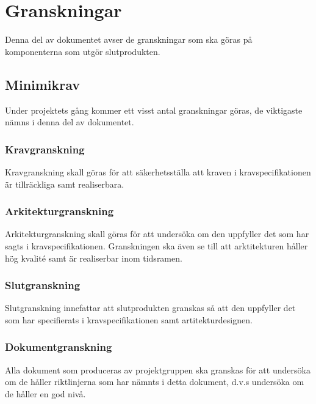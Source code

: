 \section{Granskningar}
Denna del av dokumentet avser de granskningar som ska göras på komponenterna som utgör slutprodukten. 

\subsection{Minimikrav}
Under projektets gång kommer ett visst antal granskningar göras, de viktigaste nämns i denna del av dokumentet. 

\subsubsection{Kravgranskning}
Kravgranskning skall göras för att säkerhetsställa att kraven i kravspecifikationen är tillräckliga samt realiserbara.

\subsubsection{Arkitekturgranskning}
Arkitekturgranskning skall göras för att undersöka om den uppfyller det som har sagts i kravspecifikationen. Granskningen ska även se till att arktitekturen håller hög kvalité samt är realiserbar inom tidsramen.

\subsubsection{Slutgranskning}
Slutgranskning innefattar att slutprodukten granskas så att den uppfyller det som har specifierats i kravspecifikationen samt artitekturdesignen. 

\subsubsection{Dokumentgranskning}
Alla dokument som produceras av projektgruppen ska granskas för att undersöka om de håller riktlinjerna som har nämnts i detta dokument, d.v.s undersöka om de håller en god nivå. 



